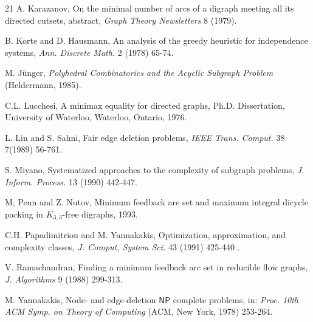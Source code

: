{\begin{thebibliography} {21}
     A. Karazanov, On the minimal number of arcs of a digraph meeting all its directed cutsets, abstract, \textit{Graph Theory Newsletters} 8 (1979).

    B. Korte and D. Hausmann, An analysis of the greedy heuristic for independence systems, \textit{Ann. Discrete Math.} 2 (1978) 65-74.

    M. Jünger, \textit{Polyhedral Combinatorics and the Acyclic Subgraph Problem} (Heldermann, 1985).

    C.L. Lucchesi, A minimax equality for directed graphs, Ph.D. Dissertation, University of Waterloo, Waterloo, Ontario, 1976.

    L. Lin and S. Sahni, Fair edge deletion problems, \textit{IEEE Trans. Comput.} 38 7(1989) 56-761.

    S. Miyano, Systematized approaches to the complexity of subgraph problems, \textit{J. Inform. Process.} 13 (1990) 442-447.

    M, Penn and Z. Nutov, Minimum feedback are set and maximum integral dicycle packing in $K_{3,3}$-free digraphs, 1993.

    C.H. Papadimitriou and M. Yannakakis, Optimization, approximation, and complexity classes, \textit{J. Comput, System Sci.} 43 (1991) 425-440 .

    V. Ramachandran, Finding a minimum feedback arc set in reducible flow graphs, \textit{J. Algorithms} 9 (1988)
    299-313.

    M. Yannakakis, Node- and edge-deletion $\mathsf{NP}$ complete problems, in: \textit{Proc. 10th ACM Symp. on Theory of Computing} (ACM, New York, 1978) 253-264.

  \end{thebibliography}

}